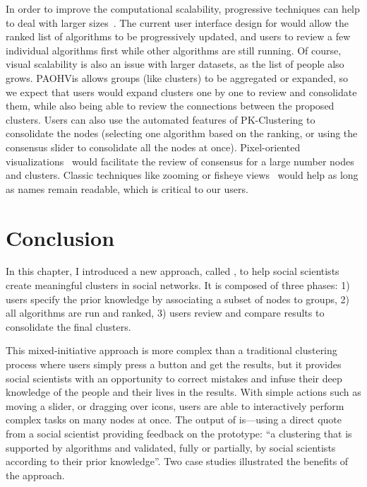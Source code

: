 In order to improve the computational scalability, progressive techniques can help to deal with larger sizes~\cite{Progressive}.
The current user interface design for \pkclustering would allow the ranked list of algorithms to be progressively updated, and users to review a few individual algorithms first while other algorithms are still running.  Of course, visual scalability is also an issue with larger datasets, as the list of people also grows.
PAOHVis allows groups (like clusters) to be aggregated or expanded, so we expect that users would expand clusters one by one to review and consolidate them, while also being able to review the connections between the proposed clusters.
Users can also use the automated features of PK-Clustering to consolidate the nodes (\eg selecting one algorithm based on the ranking, or using the consensus slider to consolidate all the nodes at once).
Pixel-oriented visualizations~\cite{keim2000pixel} would facilitate the review of consensus for a large number nodes and clusters.
Classic techniques like zooming or fisheye views~\cite{Jakobsen06-fisheye, rao94} would help as long as names remain readable, which is critical to our users.

\section{Conclusion}

In this chapter, I introduced a new approach, called \pkclustering, to help social scientists create meaningful clusters in social networks. It is composed of three phases: 1) users specify the prior knowledge by associating a subset of nodes to groups, 2) all algorithms are run and ranked, 3) users review and compare results to consolidate the final clusters.

This mixed-initiative approach is more complex than a traditional clustering process where users simply press a button and get the results, but it provides social scientists with an opportunity to correct mistakes and infuse their deep knowledge of the people and their lives in the results.
With simple actions such as moving a slider, or dragging over icons, users are able to interactively perform complex tasks on many nodes at once. The output of \pkclustering is---using a direct quote from a social scientist providing feedback on the prototype:  ``a clustering that is supported by algorithms and validated, fully or partially, by social scientists according to their prior knowledge''. Two case studies illustrated the benefits of the approach.

